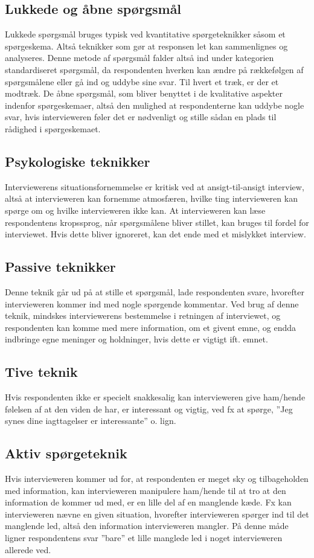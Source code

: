 \subsection{Lukkede og åbne spørgsmål}
Lukkede spørgsmål bruges typisk ved kvantitative spørgeteknikker såsom et spørgeskema. Altså teknikker som gør at responsen let kan sammenlignes og analyseres. Denne metode af spørgsmål falder altså ind under kategorien standardiseret spørgsmål, da respondenten hverken kan ændre på rækkefølgen af spørgsmålene eller gå ind og uddybe sine svar. 
Til hvert et træk, er der et modtræk. De åbne spørgsmål, som bliver benyttet i de kvalitative aspekter indenfor spørgeskemaer, altså den mulighed at respondenterne kan uddybe nogle svar, hvis intervieweren føler det er nødvenligt og stille sådan en plads til rådighed i spørgeskemaet.

\subsection{Psykologiske teknikker}
Interviewerens situationsfornemmelse er kritisk ved at ansigt-til-ansigt interview, altså at intervieweren kan fornemme atmosfæren, hvilke ting intervieweren kan spørge om og hvilke intervieweren ikke kan. At intervieweren kan læse respondentens kropssprog, når spørgsmålene bliver stillet, kan bruges til fordel for interviewet. Hvis dette bliver ignoreret, kan det ende med et mislykket interview.

\subsection{Passive teknikker}
Denne teknik går ud på at stille et spørgsmål, lade respondenten svare, hvorefter intervieweren kommer ind med nogle spørgende kommentar. Ved brug af denne teknik, mindskes interviewerens bestemmelse i retningen af interviewet, og respondenten kan komme med mere information, om et givent emne, og endda indbringe egne meninger og holdninger, hvis dette er vigtigt ift. emnet.

\subsection{Tive teknik}
Hvis respondenten ikke er specielt snakkesalig kan intervieweren give ham/hende følelsen af at den viden de har, er interessant og vigtig, ved fx at spørge, ”Jeg synes dine iagttagelser er interessante” o. lign.

\subsection{Aktiv spørgeteknik}
Hvis intervieweren kommer ud for, at respondenten er meget sky og tilbageholden med information, kan intervieweren manipulere ham/hende til at tro at den information de kommer ud med, er en lille del af en manglende kæde. Fx kan intervieweren nævne en given situation, hvorefter intervieweren spørger ind til det manglende led, altså den information intervieweren mangler. På denne måde ligner respondentens svar ”bare” et lille manglede led i noget intervieweren allerede ved.


